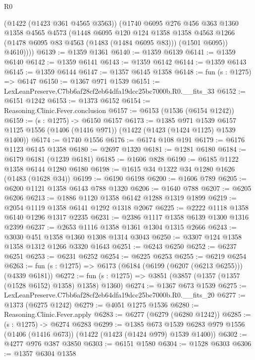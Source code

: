 \begin{lexlean}{R0}
\begin{coremodule}
          (@1422 (@1423 @361 @4565 @3563))
          (@1740
            @6095
            @276
            @456
            @363
            @1360
            @1358
            @4565
            @4573
            (@1448
              @6095
              @120
              @124
              @1358
              @1358
              @4563
              @1266
              (@1478 @6095 @83 @4563 (@1483 (@1484 @6095 @83)))
              (@1501 @6095))
            @4610))))
@6139 := @1359 @1361
@6140 := @1359 @6139
@6141 := @1359 @6140
@6142 := @1359 @6141
@6143 := @1359 @6142
@6144 := @1359 @6143
@6145 := @1359 @6144
@6147 := @1357 @6145 @1358
@6148 := fun (s : @1275) => @6147
@6150 := @1367 @971 @1539
@6151 := LexLeanPreserve.C7bb6af28cf2eb64dfa19dcc25bc7000b.R0.__fits_33
@6152 := @6151 @1242
@6153 := @1373 @6152
@6154 := Reasoning.Clinic.Fever.conclusion
@6157 := @6153 (@1536 (@6154 @1242))
@6159 := (s : @1275) -> @6150 @6157
@6173 := @1385
    @971
    @1539
    @6157
    @1125
    @1556
    (@1406 (@1416 @971))
    (@1422 (@1423 (@1424 @1125) @1539 @1400))
@6174 := @1740 @1556
@6176 := @6174 @108 @191
@6179 := @6176 @1123 @6145 @1358
@6180 := @2697 @1320
@6181 := @1281 @6180
@6184 := @6179 @6181 (@1239 @6181)
@6185 := @1606 @828
@6190 := @6185 @1122 @1358 @6144 @1280 @6180
@6198 := @1615 @34 @1322 @34 @1280 @1626 (@1483 (@1628 @34))
@6199 := @6190 @6198
@6200 := @1606 @789
@6205 := @6200 @1121 @1358 @6143 @788 @1320
@6206 := @1640 @788
@6207 := @6205 @6206
@6213 := @1886 @1120 @1358 @6142 @1288 @1319 @1899
@6219 := @2054 @1119 @1358 @6141 @1292 @1318 @2067
@6225 := @2222 @1118 @1358 @6140 @1296 @1317 @2235
@6231 := @2386 @1117 @1358 @6139 @1300 @1316 @2399
@6237 := @2653 @1116 @1358 @1361 @1304 @1315 @2666
@6243 := @3030 @451 @1358 @1360 @1308 @1314 @3043
@6250 := @3307 @124 @1358 @1358 @1312 @1266 @3320 @1643
@6251 := @6243 @6250
@6252 := @6237 @6251
@6253 := @6231 @6252
@6254 := @6225 @6253
@6255 := @6219 @6254
@6263 := fun (s : @1275) => @6173 (@6184 (@6199 (@6207 (@6213 @6255))) (@4339 @6181))
@6272 := fun (s : @1275) => @3851 (@3857 (@1357 (@1357 (@1528 @6152) @1358) @1358) @1360)
@6274 := @1367 @673 @1539
@6275 := LexLeanPreserve.C7bb6af28cf2eb64dfa19dcc25bc7000b.R0.__fits_20
@6277 := @1373 (@6275 @1242)
@6279 := @4051 @1275 @1536
@6280 := Reasoning.Clinic.Fever.apply
@6283 := @6277 (@6279 (@6280 @1242))
@6285 := (s : @1275) -> @6274 @6283
@6299 := @1385
    @673
    @1539
    @6283
    @979
    @1556
    (@1406 (@1416 @673))
    (@1422 (@1423 (@1424 @979) @1539 @1400))
@6302 := @4277 @976 @387 @3850
@6303 := @6151 @1580
@6304 := @1528 @6303
@6306 := @1357 @6304 @1358

\end{coremodule}
\end{lexlean}
